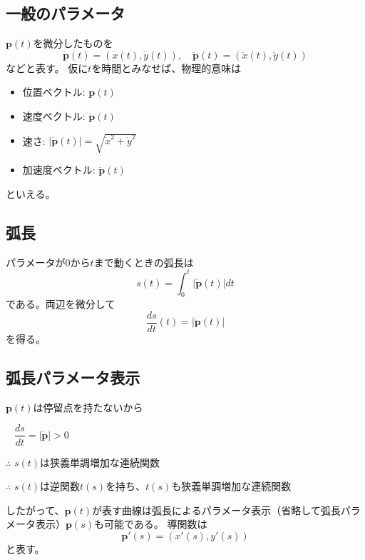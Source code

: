 \documentclass[a4j,disablejfam,dvipdfmx,papersize,slide,uplatex,21pt]{jsarticle}
\begin{document}
\newpage
\subsection*{一般のパラメータ}
$\bm{p}(t)$を微分したものを
\begin{equation}
    \dot{\bm{p}}(t) = (\dot{x}(t), \dot{y}(t)),\quad
    \ddot{\bm{p}}(t) = (\ddot{x}(t), \ddot{y}(t))
\end{equation}
などと表す。
仮に$t$を時間とみなせば、物理的意味は
\begin{itemize}
    \item 位置ベクトル: $\bm{p}(t)$
    \item 速度ベクトル: $\bm{\dot{p}}(t)$
    \item 速さ: $|\dot{\bm{p}}(t)| = \sqrt{\dot{x}^2 + \dot{y}^2}$
    \item 加速度ベクトル: $\bm{\ddot{p}}(t)$
\end{itemize}
といえる。

\newpage
\subsection*{弧長}
パラメータが$0$から$t$まで動くときの弧長は
\begin{equation}
    s(t) = \int_0^t |\dot{\bm{p}}(t)| dt
\end{equation}
である。両辺を微分して
\begin{equation}
    \frac{ds}{dt}(t) = |\dot{\bm{p}}(t)|
\end{equation}
を得る。

\newpage
\subsection*{弧長パラメータ表示}
$\bm{p}(t)$は停留点を持たないから

$\phantom{\therefore}$ $\dfrac{ds}{dt} = |\dot{\bm{p}}| > 0$

$\therefore$ $s(t)$は狭義単調増加な連続関数

$\therefore$ $s(t)$は逆関数$t(s)$を持ち、$t(s)$も狭義単調増加な連続関数

\vspace{1em}

したがって、$\bm{p}(t)$が表す曲線は弧長によるパラメータ表示（省略して弧長パラメータ表示）$\bm{p}(s)$も可能である。
導関数は
\begin{equation}
    \bm{p}'(s) = (x'(s), y'(s))
\end{equation}
と表す。
\end{document}
